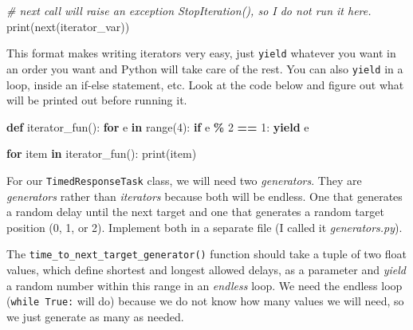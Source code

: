 \documentclass[
]{book}
\newenvironment{Shaded}{\begin{snugshade}}{\end{snugshade}}
\newcommand{\BuiltInTok}[1]{#1}
\newcommand{\CommentTok}[1]{\textcolor[rgb]{0.56,0.35,0.01}{\textit{#1}}}
\newcommand{\ControlFlowTok}[1]{\textcolor[rgb]{0.13,0.29,0.53}{\textbf{#1}}}
\newcommand{\DecValTok}[1]{\textcolor[rgb]{0.00,0.00,0.81}{#1}}
\newcommand{\KeywordTok}[1]{\textcolor[rgb]{0.13,0.29,0.53}{\textbf{#1}}}
\newcommand{\NormalTok}[1]{#1}
\newcommand{\OperatorTok}[1]{\textcolor[rgb]{0.81,0.36,0.00}{\textbf{#1}}}
\begin{document}
\begin{Shaded}
\begin{Highlighting}[]
\CommentTok{\# next call will raise an exception StopIteration(), so I do not run it here.}
\BuiltInTok{print}\NormalTok{(}\BuiltInTok{next}\NormalTok{(iterator\_var))}
\end{Highlighting}
\end{Shaded}

This format makes writing iterators very easy, just \texttt{yield} whatever you want in an order you want and Python will take care of the rest. You can also \texttt{yield} in a loop, inside an if-else statement, etc. Look at the code below and figure out what will be printed out before running it.

\begin{Shaded}
\begin{Highlighting}[]
\KeywordTok{def}\NormalTok{ iterator\_fun():}
  \ControlFlowTok{for}\NormalTok{ e }\KeywordTok{in} \BuiltInTok{range}\NormalTok{(}\DecValTok{4}\NormalTok{):}
    \ControlFlowTok{if}\NormalTok{ e }\OperatorTok{\%} \DecValTok{2} \OperatorTok{==} \DecValTok{1}\NormalTok{:}
      \ControlFlowTok{yield}\NormalTok{ e}

\ControlFlowTok{for}\NormalTok{ item }\KeywordTok{in}\NormalTok{ iterator\_fun():}
  \BuiltInTok{print}\NormalTok{(item)}
\end{Highlighting}
\end{Shaded}

For our \texttt{TimedResponseTask} class, we will need two \emph{generators}. They are \emph{generators} rather than \emph{iterators} because both will be endless. One that generates a random delay until the next target and one that generates a random target position (0, 1, or 2). Implement both in a separate file (I called it \emph{generators.py}).

The \texttt{time\_to\_next\_target\_generator()} function should take a tuple of two float values, which define shortest and longest allowed delays, as a parameter and \emph{yield} a random number within this range in an \emph{endless} loop. We need the endless loop (\texttt{while\ True:} will do) because we do not know how many values we will need, so we just generate as many as needed.
\end{document}
